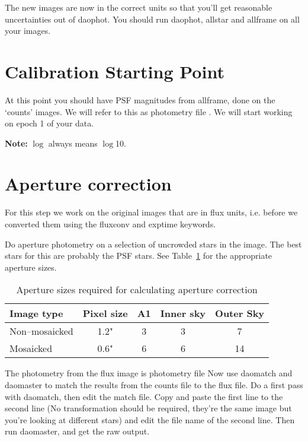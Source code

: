 \documentclass[11pt]{article}
\newcommand*\circled[1]{\tikz[baseline=(char.base)]{
            \node[shape=circle,draw,inner sep=2pt] (char) {#1};}}
\begin{document}
The new images are now in the correct units so that you'll get reasonable uncertainties out of daophot. You should run daophot, allstar and allframe on all your images. 

\section{Calibration Starting Point}
\label{start}

At this point you should have PSF magnitudes from allframe, done on the `counts' images. We will refer to this as photometry file \circled{1}. We will start working on epoch 1 of your data.

\textbf{Note:} $\log$ always means $\log$10.


\section{Aperture correction}
\label{sec:apcor}
For this step we work on the original images that are in flux units, i.e. before we converted them using the fluxconv and exptime keywords. 

Do aperture photometry on a selection of uncrowded stars in the image. The best stars for this are probably the PSF stars. See Table~\ref{tab:apertures} for the appropriate aperture sizes.

\begin{table}
\begin{center}
\begin{tabular}{l c c c c} \hline
Image type & Pixel size & A1 & Inner sky  & Outer Sky   \\ \hline \hline
Non--mosaicked & 1.2" & 3 & 3 & 7 \\
Mosaicked & 0.6" & 6 & 6 & 14 \\ 
\hline
\end{tabular}
\caption{Aperture sizes required for calculating aperture correction}
\label{tab:apertures}
\end{center}
\end{table}

The photometry from the flux image is photometry file \circled{2}
Now use daomatch and daomaster to match the results from the counts file to the flux file. Do a first pass with daomatch, then edit the match file. Copy and paste the first line to the second line (No transformation should be required, they're the same image but you're looking at different stars) and edit the file name of the second line. Then run daomaster, and get the raw output.
\end{document}
